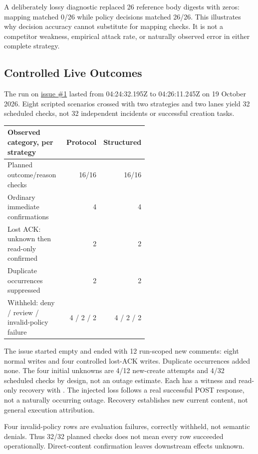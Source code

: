\documentclass[11pt,letterpaper]{article}
\begin{document}
A deliberately lossy diagnostic replaced 26 reference body digests with zeros:
mapping matched 0/26 while policy decisions matched 26/26. This illustrates
why decision accuracy cannot substitute for mapping checks. It is not a
competitor weakness, empirical attack rate, or naturally observed error in
either complete strategy.

\subsection{Controlled Live Outcomes}

The run on \href{https://github.com/OndCo/Action-Effect-Bench/issues/1}{issue \#1}
lasted from 04:24:32.195Z to 04:26:11.245Z on 19 October 2026. Eight scripted
scenarios crossed with two strategies and two lanes yield 32 scheduled checks,
not 32 independent incidents or successful creation tasks.

\begin{center}
\small
\begin{tabular}{@{}p{0.56\linewidth}rr@{}}
\hline
Observed category, per strategy & Protocol & Structured \\
\hline
Planned outcome/reason checks & 16/16 & 16/16 \\
Ordinary immediate confirmations & 4 & 4 \\
Lost ACK: unknown then read-only confirmed & 2 & 2 \\
Duplicate occurrences suppressed & 2 & 2 \\
Withheld: deny / review / invalid-policy failure & 4 / 2 / 2 & 4 / 2 / 2 \\
\hline
\end{tabular}
\end{center}

The issue started empty and ended with 12 run-scoped new comments: eight normal
writes and four controlled lost-ACK writes. Duplicate occurrences added none.
The four initial unknowns are 4/12 new-create attempts and 4/32 scheduled
checks by design, not an outage estimate. Each has a
 witness and read-only recovery with
. The injected loss follows a real successful
POST response, not a naturally occurring outage. Recovery establishes new
current content, not general execution attribution.

Four invalid-policy rows are evaluation failures, correctly withheld, not
semantic denials. Thus 32/32 planned checks does not mean every row succeeded
operationally. Direct-content confirmation leaves downstream effects unknown.
\end{document}
